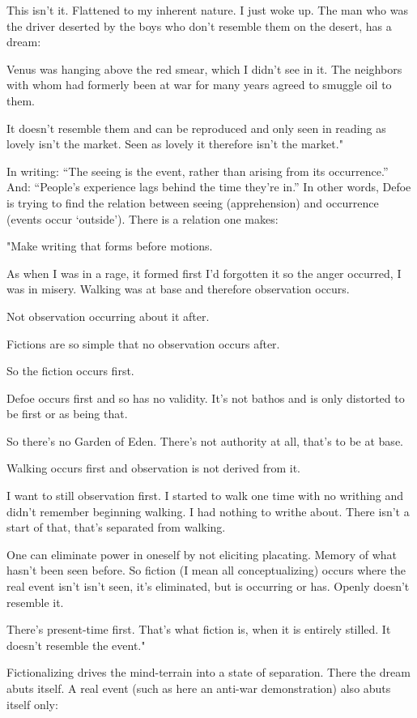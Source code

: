 \documentclass[
]{memoir}
\begin{document}
This isn't it. Flattened to my inherent nature. I just woke up. The man
who was the driver deserted by the boys who don't resemble them on the
desert, has a dream:

Venus was hanging above the red smear, which I didn't see in it. The
neighbors with whom had formerly been at war for many years agreed to
smuggle oil to them.

It doesn't resemble them and can be reproduced and only seen in reading
as lovely isn't the market. Seen as lovely it therefore isn't the
market."

In writing: ``The seeing is the event, rather than arising from its
occurrence.'' And: ``People's experience lags behind the time they're
in.'' In other words, Defoe is trying to find the relation between
seeing (apprehension) and occurrence (events occur `outside'). There is
a relation one makes:

"Make writing that forms before motions.

As when I was in a rage, it formed first I'd forgotten it so the anger
occurred, I was in misery. Walking was at base and therefore observation
occurs.

Not observation occurring about it after.

Fictions are so simple that no observation occurs after.

So the fiction occurs first.

Defoe occurs first and so has no validity. It's not bathos and is only
distorted to be first or as being that.

So there's no Garden of Eden. There's not authority at all, that's to be
at base.

Walking occurs first and observation is not derived from it.

I want to still observation first. I started to walk one time with no
writhing and didn't remember beginning walking. I had nothing to writhe
about. There isn't a start of that, that's separated from walking.

One can eliminate power in oneself by not eliciting placating. Memory of
what hasn't been seen before. So fiction (I mean all conceptualizing)
occurs where the real event isn't isn't seen, it's eliminated, but is
occurring or has. Openly doesn't resemble it.

There's present-time first. That's what fiction is, when it is entirely
stilled. It doesn't resemble the event."

Fictionalizing drives the mind-terrain into a state of separation. There
the dream abuts itself. A real event (such as here an anti-war
demonstration) also abuts itself only:
\end{document}
